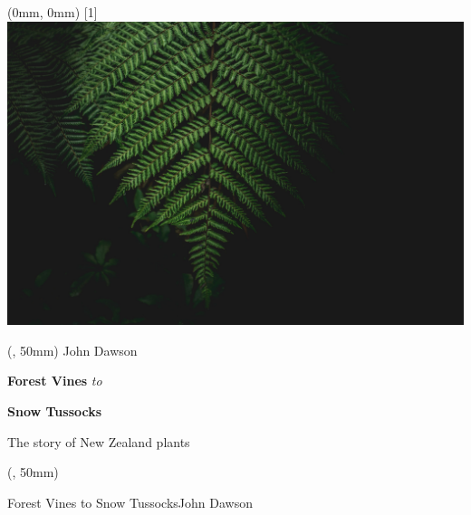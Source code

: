 \documentclass{article}
\newlength{\frontcoverwidth}
\newlength{\frontcoveroffset}
\newlength{\spineoffset}
\begin{document}
	\color{white}%
	\sffamily%
	\begin{textblock*}{\paperwidth} (0mm, 0mm)
		\scalebox{-1}[1]{\includegraphics[height=1.0\paperheight, keepaspectratio]{graphics/racim-amr-9uKUR7TwNpU-unsplash.jpg}}
	\end{textblock*}

	\begin{textblock*}{\frontcoverwidth} (\frontcoveroffset, 50mm) %
		\fontsize{28}{33}\selectfont%
		John Dawson\par
		\vspace{12em}%
		\raggedleft%
		\fontsize{44}{52}\selectfont%
		\textbf{Forest Vines}\emph{ to}\par
		\textbf{Snow Tussocks}\par
		\vspace{0.5em}
		\fontsize{28}{33}\selectfont%
		The story of New Zealand plants
	\end{textblock*}

	\begin{textblock*}{1pt} (\spineoffset-9pt, 50mm)
		\centering%
		\begin{rotate}{-90}
			\fontsize{22}{22}\selectfont%
			Forest Vines to Snow Tussocks\hspace{8em}John Dawson
		\end{rotate}
	\end{textblock*}
\end{document}
